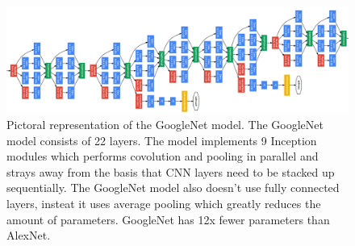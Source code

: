 \begin{figure}[htp!]
\centering
\includegraphics[width=\linewidth]{figs/googlenet.png}
\caption{Pictoral representation of the GoogleNet model. The GoogleNet model consists of 22 layers. The model implements 9 Inception modules which performs covolution and pooling in parallel and strays away from the basis that CNN layers need to be stacked up sequentially. The GoogleNet model also doesn't use fully connected layers, insteat it uses average pooling which greatly reduces the amount of parameters. GoogleNet has 12x fewer parameters than AlexNet. }
\label{fig:googlenet}
\end{figure}
